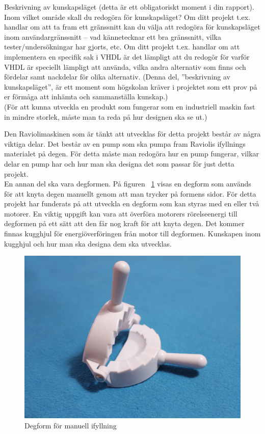 Beskrivning av kunskapsläget (detta är ett obligatoriskt moment i din rapport). Inom vilket område skall du redogöra för kunskapsläget? Om ditt projekt t.ex. handlar om att ta fram ett gränssnitt kan du välja att redogöra för kunskapsläget inom användargränssnitt – vad kännetecknar ett bra gränssnitt, vilka tester/undersökningar har gjorts, etc. Om ditt projekt t.ex. handlar om att implementera en specifik sak i VHDL är det lämpligt att du redogör för varför VHDL är speciellt lämpligt att använda, vilka andra alternativ som finns och fördelar samt nackdelar för olika alternativ. (Denna del, ”beskrivning av kunskapsläget”, är ett moment som högskolan kräver i projektet som ett prov på er förmåga att inhämta och sammanställa kunskap.)\\

(För att kunna utveckla en produkt som fungerar som en industriell maskin fast in mindre storlek, måste man ta reda på hur designen ska se ut.)
 
Den Raviolimaskinen som är tänkt att utvecklas för detta projekt består av några viktiga delar. Det består av en pump som ska pumpa fram Raviolis ifyllnings materialet på degen. För detta måste man redogöra hur en pump fungerar, vilkar delar en pump har och hur man ska designa det som passar för just detta projekt.\\

En annan del ska vara degformen. På figuren ~\ref{degfrom} visas en degform som används för att knyta degen manuellt genom att man trycker på formens sidor. För detta projekt har funderats på att utveckla en degform som kan styras med en eller två motorer. En viktig uppgift kan vara att överföra motorers rörelseenergi till degformen på ett sätt att den får nog kraft för att knyta degen. Det kommer finnas kugghjul för energiöverföringen från motor till degformen. Kunskapen inom kugghjul och hur man ska designa dem ska utvecklas.

\begin{figure}[h]
	\begin{center}
		\includegraphics[scale=0.08] {images/degform.jpg}
		\caption{Degform för manuell ifyllning}
		\label{degfrom}	
	\end{center}
\end{figure}\\

